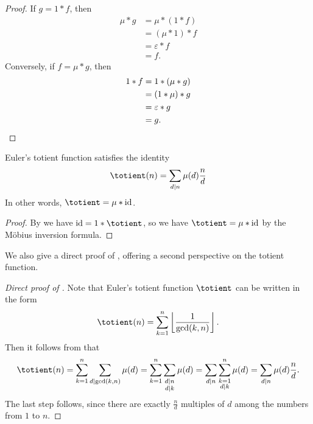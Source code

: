 \begin{proof}
  If $g=1\ast f$, then
  \begin{align*}
    \mu\ast g & = \mu\ast(1\ast f) \\
              & = (\mu\ast 1)\ast f \\
              & = \varepsilon \ast f \\
              & = f.
  \end{align*}
  Conversely, if $f=\mu\ast g$, then
  \begin{align*}
    1\ast f & = 1\ast(\mu\ast g) \\
            & = (1 \ast \mu)\ast g \\
            & = \varepsilon \ast g \\
            & = g.\qedhere
  \end{align*}
\end{proof}

\begin{corollary}\label{corollary:mobius-inversion-totient}
  Euler's totient function satisfies the identity
  \begin{equation*}
    \totient(n) = \sum_{d\mid n}\mu(d)\frac{n}{d}
  \end{equation*}
  In other words, $\totient=\mu\ast\mathrm{id}$.
\end{corollary}

\begin{proof}
  By  we have $\mathrm{id}=1\ast \totient$, so we have $\totient=\mu\ast\mathrm{id}$ by the M\"obius inversion formula.
\end{proof}

We also give a direct proof of , offering a second perspective on the totient function.

\begin{proof}[Direct proof of ]
  Note that Euler's totient function $\totient$ can be written in the form
  \begin{equation*}
    \totient(n) = \sum_{k=1}^n\left\lfloor\frac{1}{\gcd(k,n)}\right\rfloor.
  \end{equation*}
  Then it follows from  that
  \begin{equation*}
    \totient(n) = \sum_{k=1}^n\sum_{d\mid \gcd(k,n)}\mu(d)
    = \sum_{k=1}^n\sum_{\substack{d\mid n \\ d\mid k}}\mu(d)
    = \sum_{d\mid n}\sum_{\substack{k=1 \\ d\mid k}}^n \mu(d)
    = \sum_{d\mid n} \mu(d)\frac{n}{d}.
  \end{equation*}
  The last step follows, since there are exactly $\tfrac{n}{d}$ multiples of $d$ among the numbers from $1$ to $n$.
\end{proof}

